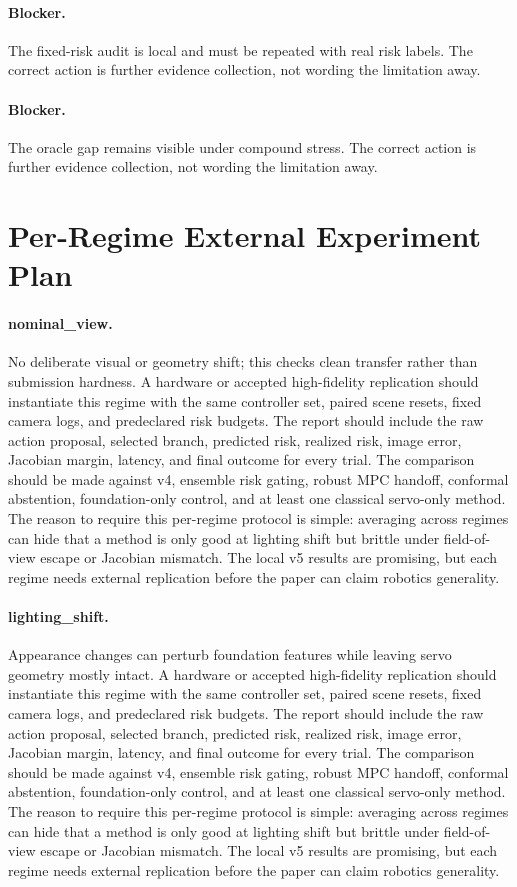 \documentclass{article}
\begin{document}
\paragraph{Blocker.} The fixed-risk audit is local and must be repeated with real risk labels. The correct action is further evidence collection, not wording the limitation away.
\paragraph{Blocker.} The oracle gap remains visible under compound stress. The correct action is further evidence collection, not wording the limitation away.
\clearpage
\section{Per-Regime External Experiment Plan}
\paragraph{nominal\_view.} No deliberate visual or geometry shift; this checks clean transfer rather than submission hardness.
A hardware or accepted high-fidelity replication should instantiate this regime with the same controller set, paired scene resets, fixed camera logs, and predeclared risk budgets. The report should include the raw action proposal, selected branch, predicted risk, realized risk, image error, Jacobian margin, latency, and final outcome for every trial. The comparison should be made against v4, ensemble risk gating, robust MPC handoff, conformal abstention, foundation-only control, and at least one classical servo-only method.
The reason to require this per-regime protocol is simple: averaging across regimes can hide that a method is only good at lighting shift but brittle under field-of-view escape or Jacobian mismatch. The local v5 results are promising, but each regime needs external replication before the paper can claim robotics generality.
\paragraph{lighting\_shift.} Appearance changes can perturb foundation features while leaving servo geometry mostly intact.
A hardware or accepted high-fidelity replication should instantiate this regime with the same controller set, paired scene resets, fixed camera logs, and predeclared risk budgets. The report should include the raw action proposal, selected branch, predicted risk, realized risk, image error, Jacobian margin, latency, and final outcome for every trial. The comparison should be made against v4, ensemble risk gating, robust MPC handoff, conformal abstention, foundation-only control, and at least one classical servo-only method.
The reason to require this per-regime protocol is simple: averaging across regimes can hide that a method is only good at lighting shift but brittle under field-of-view escape or Jacobian mismatch. The local v5 results are promising, but each regime needs external replication before the paper can claim robotics generality.
\end{document}
